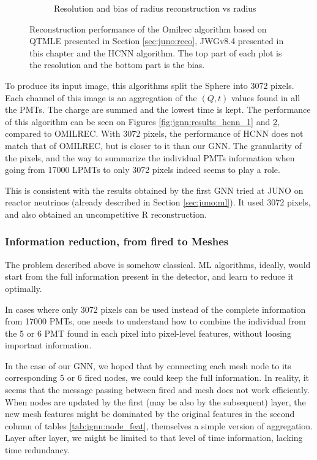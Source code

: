 \documentclass[../main.tex]{subfiles}
\begin{document}
\begin{figure}[ht]
\begin{subfigure}[t]{0.48\linewidth}
    \caption{Resolution and bias of radius reconstruction vs radius}
    \label{fig:jgnn:MSBvRTC_hcnn}
  \end{subfigure}
  \caption{Reconstruction performance of the Omilrec algorithm based on QTMLE presented in Section \ref{sec:juno:reco}, JWGv8.4 presented in this chapter and the HCNN algorithm. The top part of each plot is the resolution and the bottom part is the bias.}
  \label{fig:jgnn:results_hcnn_2}
\end{figure}


To produce its input image, this algorithms split the Sphere into 3072 pixels. Each channel of this image is an aggregation of the $(Q, t)$ values found in all the PMTs. The charge are summed and the lowest time is kept. The performance of this algorithm can be seen on Figures \ref{fig:jgnn:results_hcnn_1} and \ref{fig:jgnn:results_hcnn_2}, compared to OMILREC. With 3072 pixels, the performance of HCNN does not match that of OMILREC, but is closer to it than our GNN. The granularity of the pixels, and the way to summarize the individual PMTs information when going from 17000 LPMTs to only 3072 pixels indeed seems to play a role.

This is consistent with the results obtained by the first GNN tried at JUNO on reactor neutrinos (already described in Section \ref{sec:juno:ml}).
It used 3072 pixels, and also obtained an uncompetitive R reconstruction.

\subsubsection{Information reduction, from fired to Meshes}

The problem described above is somehow classical. ML algorithms, ideally, would start from the full information present in the detector, and learn to reduce it optimally.

In cases where only 3072 pixels can be used instead of the complete information from 17000 PMTs, one needs to understand how to combine the individual from the 5 or 6 PMT found in each pixel into pixel-level features, without loosing important information.

In the case of our GNN, we hoped that by connecting each mesh node to its corresponding 5 or 6 fired nodes, we could keep the full information. In reality, it seems that the message passing between fired and mesh does not work efficiently. When nodes are updated by the first (may be also by the subsequent) layer, the new mesh features might be dominated by the original features in the second column of tables \ref{tab:jgnn:node_feat}, themselves a simple version of aggregation.
Layer after layer, we might be limited to that level of time information, lacking time redundancy.
\end{document}
